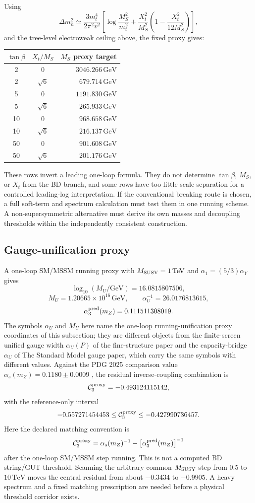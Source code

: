 \documentclass[11pt]{article}
\theoremstyle{remark}
\theoremstyle{plain}
\begin{document}
Using
\[
\Delta m_h^2
\simeq
\frac{3m_t^4}{2\pi^2v^2}
\left[
\log\frac{M_S^2}{m_t^2}
+
\frac{X_t^2}{M_S^2}
\left(
1-\frac{X_t^2}{12M_S^2}
\right)
\right],
\]
and the tree-level electroweak ceiling above, the fixed proxy gives:
\begin{longtable}{c c r}
\toprule
\(\tan\beta\) & \(X_t/M_S\) & \(M_S\) proxy target \\
\midrule
2 & \(0\) & \(3046.266\,\mathrm{GeV}\)\\
2 & \(\sqrt6\) & \(679.714\,\mathrm{GeV}\)\\
5 & \(0\) & \(1191.830\,\mathrm{GeV}\)\\
5 & \(\sqrt6\) & \(265.933\,\mathrm{GeV}\)\\
10 & \(0\) & \(968.658\,\mathrm{GeV}\)\\
10 & \(\sqrt6\) & \(216.137\,\mathrm{GeV}\)\\
50 & \(0\) & \(901.608\,\mathrm{GeV}\)\\
50 & \(\sqrt6\) & \(201.176\,\mathrm{GeV}\)\\
\bottomrule
\end{longtable}
These rows invert a leading one-loop formula. They do not determine \(\tan\beta\), \(M_S\), or
\(X_t\) from the BD branch, and some rows have too little scale separation for a controlled
leading-log interpretation. If the conventional breaking route is chosen, a full soft-term and
spectrum calculation must test them in one running scheme. A non-supersymmetric alternative must
derive its own masses and decoupling thresholds within the independently consistent construction.

\subsection{Gauge-unification proxy}

A one-loop SM/MSSM running proxy with \(M_{\rm SUSY}=1\,\mathrm{TeV}\) and
\(\alpha_1=(5/3)\alpha_Y\) gives
\[
\log_{10}(M_U/\mathrm{GeV})=16.0815807506,
\]
\[
M_U=1.20665\times10^{16}\,\mathrm{GeV},
\qquad
\alpha_U^{-1}=26.0176813615,
\]
\[
\alpha_3^{\rm pred}(m_Z)=0.111511308019.
\]
The symbols \(\alpha_U\) and \(M_U\) here name the one-loop running-unification proxy
coordinates of this subsection; they are different objects from the finite-screen unified
gauge width \(\alpha_U(P)\) of the fine-structure paper and the capacity-bridge \(\alpha_U\)
of The Standard Model gauge paper, which carry the same symbols with different values.
Against the PDG 2025 comparison value
\(\alpha_s(m_Z)=0.1180\pm0.0009\) \cite{PDG2025QCD}, the residual inverse-coupling combination is
\[
\mathcal C_3^{\rm proxy}=-0.493124115142,
\]
with the reference-only interval
\[
-0.557271454453
\leq
\mathcal C_3^{\rm proxy}
\leq
-0.427990736457.
\]
Here the declared matching convention is
\[
\mathcal C_3^{\rm proxy}
=
\alpha_s(m_Z)^{-1}-\bigl[\alpha_3^{\rm pred}(m_Z)\bigr]^{-1}
\]
after the one-loop SM/MSSM step running. This is not a computed BD string/GUT threshold.
Scanning the arbitrary common \(M_{\rm SUSY}\) step from
\(0.5\) to \(10\,\mathrm{TeV}\) moves the central residual from about \(-0.3434\) to
\(-0.9905\). A heavy spectrum and a fixed matching prescription are needed before a physical
threshold corridor exists.
\end{document}
